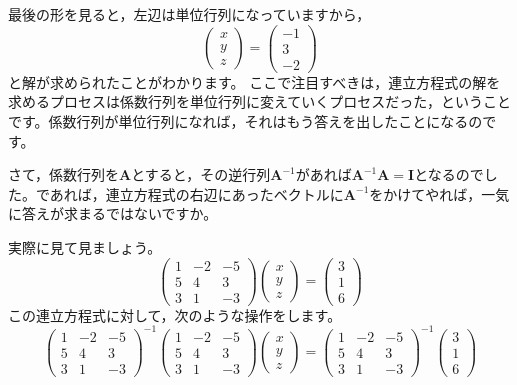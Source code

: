 \documentclass{ltjsbook}
\begin{document}
最後の形を見ると，左辺は単位行列になっていますから，
\[
\begin{pmatrix}
x\\
y\\
z
\end{pmatrix}
=
\begin{pmatrix}
-1\\
3\\
-2
\end{pmatrix}
\]
と解が求められたことがわかります。
ここで注目すべきは，連立方程式の解を求めるプロセスは係数行列を単位行列に変えていくプロセスだった，ということです。係数行列が単位行列になれば，それはもう答えを出したことになるのです。

さて，係数行列を$\bm{A}$とすると，その逆行列$\bm{A}^{-1}$があれば$\bm{A}^{-1}\bm{A} = \bm{I}$となるのでした。であれば，連立方程式の右辺にあったベクトルに$\bm{A}^{-1}$をかけてやれば，一気に答えが求まるではないですか。

実際に見て見ましょう。
\[
\begin{pmatrix} 1 & -2 & -5 \\
				5 &  4 &  3 \\
				3 &  1 & -3 \end{pmatrix}
\begin{pmatrix} x \\ y \\ z \end{pmatrix}
=
\begin{pmatrix} 3 \\ 1 \\ 6 \end{pmatrix}
\]
この連立方程式に対して，次のような操作をします。
\[
\begin{pmatrix} 1 & -2 & -5 \\
				5 &  4 &  3 \\
				3 &  1 & -3 \end{pmatrix}^{-1}
\begin{pmatrix} 1 & -2 & -5 \\
				5 &  4 &  3 \\
				3 &  1 & -3 \end{pmatrix}
\begin{pmatrix} x \\ y \\ z \end{pmatrix}
=
\begin{pmatrix} 1 & -2 & -5 \\
				5 &  4 &  3 \\
				3 &  1 & -3 \end{pmatrix}^{-1}
\begin{pmatrix} 3 \\ 1 \\ 6 \end{pmatrix}
\]
\end{document}
